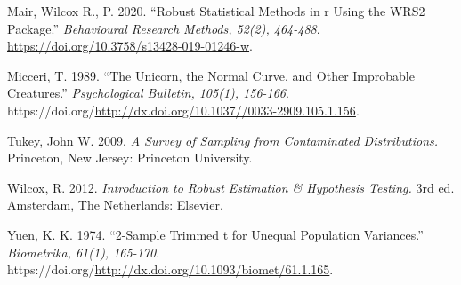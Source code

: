 \documentclass[
]{article}
\newlength{\cslhangindent}
\newenvironment{CSLReferences}[2] %
 {\begin{list}{}{%
  \setlength{\itemindent}{0pt}
  \setlength{\leftmargin}{0pt}
  \setlength{\parsep}{0pt}
  \ifodd #1
   \setlength{\leftmargin}{\cslhangindent}
   \setlength{\itemindent}{-1\cslhangindent}
  \fi
  \setlength{\itemsep}{#2\baselineskip}}}
 {\end{list}}
\begin{document}
\begin{CSLReferences}{1}{0}
Mair, Wilcox R., P. 2020. {``Robust Statistical Methods in r Using the WRS2 Package.''} \emph{Behavioural Research Methods, 52(2), 464-488}. \url{https://doi.org/10.3758/s13428-019-01246-w}.

Micceri, T. 1989. {``The Unicorn, the Normal Curve, and Other Improbable Creatures.''} \emph{Psychological Bulletin, 105(1), 156-166}. https://doi.org/\url{http://dx.doi.org/10.1037//0033-2909.105.1.156}.

Tukey, John W. 2009. \emph{A Survey of Sampling from Contaminated Distributions.} {Princeton, New Jersey: Princeton University}.

Wilcox, R. 2012. \emph{Introduction to Robust Estimation \& Hypothesis Testing.} 3rd ed. Amsterdam, The Netherlands: {Elsevier}.

Yuen, K. K. 1974. {``2-Sample Trimmed t for Unequal Population Variances.''} \emph{Biometrika, 61(1), 165-170}. https://doi.org/\url{http://dx.doi.org/10.1093/biomet/61.1.165}.

\end{CSLReferences}
\end{document}
